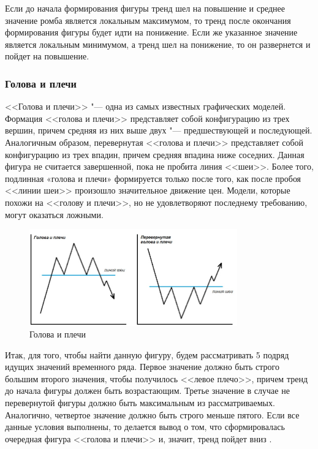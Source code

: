 \documentclass[bachelor, och, coursework]{SCWorks}
\begin{document}
    Если до начала формирования фигуры тренд шел на повышение и среднее значение
    ромба является локальным максимумом, то тренд после окончания формирования
    фигуры будет идти на понижение. Если же указанное значение является
    локальным минимумом, а тренд шел на понижение, то он развернется и пойдет на
    повышение.

    \subsubsection{Голова и плечи}
    <<Голова и плечи>> "--- одна из самых известных графических моделей.
    Формация <<голова и плечи>> представляет собой конфигурацию из трех вершин,
    причем средняя из них выше двух "--- предшествующей и последующей.
    Аналогичным образом, перевернутая <<голова и плечи>> представляет собой
    конфигурацию из трех впадин, причем средняя впадина ниже соседних. Данная
    фигура не считается завершенной, пока не пробита линия <<шеи>>. Более того,
    подлинная «голова и плечи» формируется только после того, как после пробоя
    <<линии шеи>> произошло значительное движение цен. Модели, которые похожи на
    <<голову и плечи>>, но не удовлетворяют последнему требованию, могут
    оказаться ложными.
    
    \begin{figure}[H]
        \centering
        \includegraphics[width=0.8\textwidth]{pic/headshoulders.jpg}
        \caption{Голова и плечи}
    \end{figure}

    Итак, для того, чтобы найти данную фигуру, будем рассматривать 5 подряд
    идущих значений временного ряда. Первое значение должно быть строго большим
    второго значения, чтобы получилось <<левое плечо>>, причем тренд до начала
    фигуры должен быть возрастающим. Третье значение в случае не перевернутой
    фигуры должно быть максимальным из рассматриваемых. Аналогично, четвертое
    значение должно быть строго меньше пятого. Если все данные условия
    выполнены, то делается вывод о том, что сформировалась очередная фигура
    <<голова и плечи>> и, значит, тренд пойдет вниз \cite{MSDN}.
\end{document}
